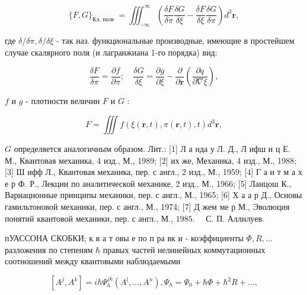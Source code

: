 \documentclass[10pt]{article}
\begin{document}
\[

\{F, G\}_{\text {Кл. поле }}=\iiint_{-\infty}^{\infty}\left(\frac{\delta F}{\delta \pi} \frac{\delta G}{\delta \xi}-\frac{\delta F}{\delta \xi} \frac{\delta G}{\delta \pi}\right) d^{3} \boldsymbol{r},

\]



где $\delta / \delta \pi, \delta / \delta \xi$ - так наз. функциональные производные, имеющие в простейшем случае скалярного поля (и лагранжиана 1-го порядка) вид:



\[

\frac{\delta F}{\delta \pi}=\frac{\partial f}{\partial \pi} ; \quad \frac{\delta G}{\delta \xi}=\frac{\partial g}{\partial \xi}-\frac{\partial}{\partial \boldsymbol{r}}\left(\frac{\partial q}{\partial \nabla \xi}\right),

\]



$f$ и $g$ - плотности величин $F$ и $G$ :



\[

F=\iiint f(\xi(\boldsymbol{r}, t), \pi(\boldsymbol{r}, t), t) d^{3} \boldsymbol{r},

\]



$G$ определяется аналогичным образом. Лит.: [1] Л а нда у Л. Д., Л ифш и ц Е. М., Квантовая механика, 4 изд., М., 1989; [2] их же, Механика, 4 изд., М., 1988; [3] Ш ифф Л., Квантовая механика, пер. с англ., 2 изд., М., 1959; [4] Г а н т м а х е р Ф. Р., Лекции по аналитической механике, 2 изд., М., 1966; [5] Ланцош К., Вариационные принципы механики, пер. с англ., М., 1965; [6] Х а а р Д., Основы гамильтоновой механики, пер. с англ., М., 1974; [7] Д жем ме р М., Эволюция понятий квантовой механики, пер. с англ., М., $1985 . \quad$ С. П. Аллилуев.



пУАССОНА СКОБКИ; к в а т овы е по п ра вк и - коэффициенты $\Phi, R, \ldots$ разложения по степеням $\hbar$ правых частей нелинейных коммутационных соотношений между квантовыми наблюдаемыми



\[

\left[A^{j}, A^{k}\right]=i \hbar \Psi_{h}^{j k}\left(A^{\mathrm{l}}, \ldots, A^{n}\right), \Psi_{h}=\Psi_{0}+\hbar \Phi+\hbar^{2} R+\ldots,

\]
\end{document}
